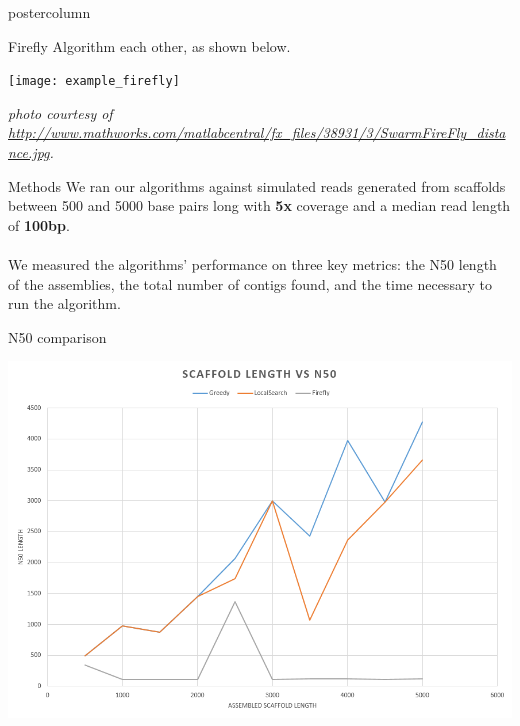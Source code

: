 \documentclass[final,hyperref={pdfpagelabels=false}]{beamer}
\begin{document}
\begin{frame}
\begin{columns}
\begin{column}{.32\textwidth}
\begin{beamercolorbox}[center,wd=\textwidth]{postercolumn}
\begin{minipage}[T]{.95\textwidth}
{\begin{block}{Firefly Algorithm}
                            each other, as shown below.
                            \begin{center}
                                \texttt{[image: example\_firefly]}
                            \end{center}
                            {\em {\small photo courtesy of \url{http://www.mathworks.com/matlabcentral/fx_files/38931/3/SwarmFireFly_distance.jpg}. } }
                        \end{block}
                        \begin{block}{Methods}
                            We ran our algorithms against simulated reads
                            generated from scaffolds between 500 and 5000 base
                            pairs long with {\bf 5x} coverage and a median read
                            length of {\bf 100bp}. \\ \\
                            We measured the algorithms' performance on three
                            key metrics: the N50 length of the assemblies, the
                            total number of contigs found, and the time
                            necessary to run the algorithm.
                        \end{block}
                        \begin{block}{N50 comparison}
                            \begin{center}
                                \includegraphics[scale=0.66]{n50}
                            \end{center}
                        \end{block}
}
\end{minipage}
\end{beamercolorbox}
\end{column}
\end{columns}
\end{frame}
\end{document}
